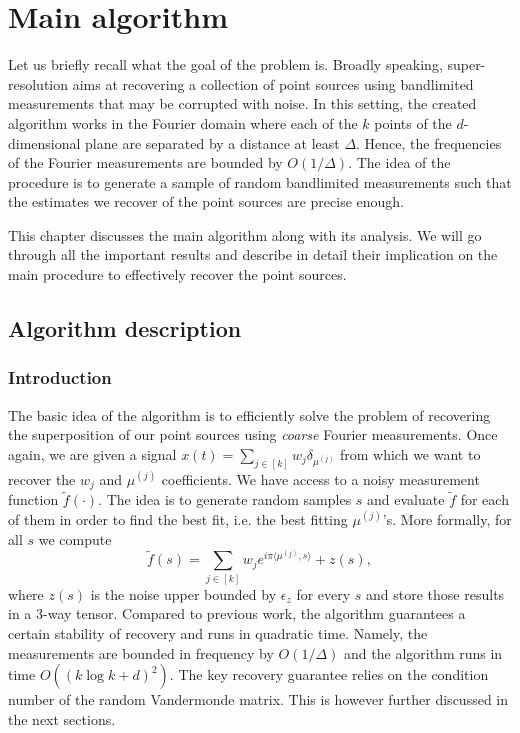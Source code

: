 \chapter{Main algorithm}
Let us briefly recall what the goal of the problem is. Broadly speaking, super-resolution aims at recovering a collection of point sources using bandlimited measurements that may be corrupted with noise. In this setting, the created algorithm works in the Fourier domain where each of the $k$ points of the $d$-dimensional plane are separated by a distance at least $\Delta$. Hence, the frequencies of the Fourier measurements are bounded by $O(1/\Delta)$. The idea of the procedure is to generate a sample of random bandlimited measurements such that the estimates we recover of the point sources are precise enough.\par 
This chapter discusses the main algorithm along with its analysis. We will go through all the important results and describe in detail their implication on the main procedure to effectively recover the point sources.

\section{Algorithm description}
\subsection{Introduction}
The basic idea of the algorithm is to efficiently solve the problem of recovering the superposition of our point sources using \textit{coarse} Fourier measurements. Once again, we are given a signal $x(t)=\sum_{j\in[k]}w_j\delta_{\mu^{(j)}}$ from which we want to recover the $w_j$ and $\mu^{(j)}$ coefficients. We have access to a noisy measurement function $\widetilde{f}(\cdot)$. The idea is to generate random samples $s$ and evaluate $\widetilde{f}$ for each of them in order to find the best fit, i.e. the best fitting $\mu^{(j)}$'s. More formally, for all $s$ we compute $$\widetilde{f}(s)=\sum_{j\in[k]}w_je^{i\pi\langle\mu^{(j)},s\rangle}+z(s),$$ where $z(s)$ is the noise upper bounded by $\epsilon_z$ for every $s$ and store those results in a 3-way tensor. Compared to previous work, the algorithm guarantees a certain stability of recovery and runs in quadratic time. Namely, the measurements are bounded in frequency by $O(1/\Delta)$ and the algorithm runs in time $O((k\log k+d)^2)$. The key recovery guarantee relies on the condition number of the random Vandermonde matrix. This is however further discussed in the next sections.
